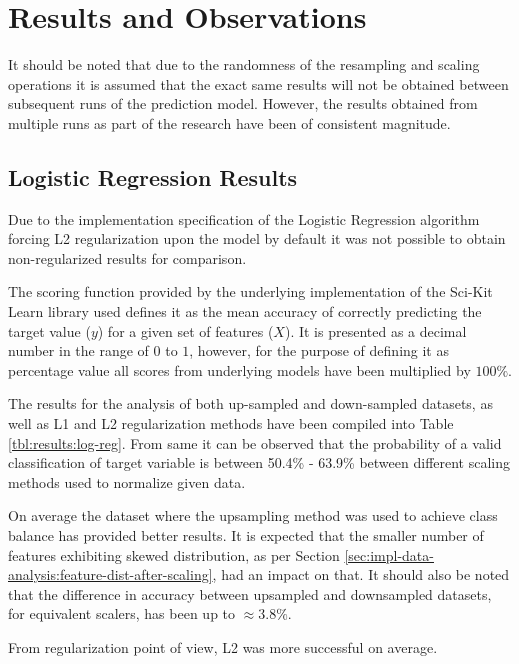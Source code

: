 \chapter{Results and Observations}\label{chp:results-and-observations}
It should be noted that due to the randomness of the resampling and scaling operations it is assumed that the exact same results will not be obtained between subsequent runs of the prediction model. However, the results obtained from multiple runs as part of the research have been of consistent magnitude.
\section{Logistic Regression Results}\label{sec:results:log-reg}
Due to the implementation specification of the Logistic Regression algorithm forcing L2 regularization upon the model by default it was not possible to obtain non-regularized results for comparison.

The scoring function provided by the underlying implementation of the Sci-Kit Learn library used defines it as the mean accuracy of correctly predicting the target value ($y$) for a given set of features ($X$). It is presented as a decimal number in the range of $ 0$ to $1$, however, for the purpose of defining it as percentage value all scores from underlying models have been multiplied by $100\%$.

The results for the analysis of both up-sampled and down-sampled datasets, as well as L1 and L2 regularization methods have been compiled into Table \ref{tbl:results:log-reg}. From same it can be observed that the probability of a valid classification of \isBug{} target variable is between 50.4\% - 63.9\% between different scaling methods used to normalize given data.

On average the dataset where the upsampling method was used to achieve class balance has provided better results. It is expected that the smaller number of features exhibiting skewed distribution, as per Section \ref{sec:impl-data-analysis:feature-dist-after-scaling}, had an impact on that. It should also be noted that the difference in accuracy between upsampled and downsampled datasets, for equivalent scalers, has been up to $\approx 3.8\%$.

From regularization point of view, L2 was more successful on average.

